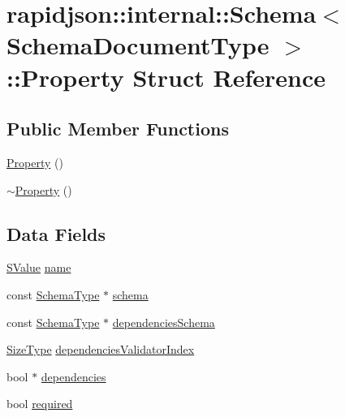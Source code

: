 \hypertarget{structrapidjson_1_1internal_1_1_schema_1_1_property}{}\section{rapidjson\+::internal\+::Schema$<$ Schema\+Document\+Type $>$\+::Property Struct Reference}
\label{structrapidjson_1_1internal_1_1_schema_1_1_property}
\subsection*{Public Member Functions}
\begin{DoxyCompactItemize}
\item 
\mbox{\hyperlink{structrapidjson_1_1internal_1_1_schema_1_1_property_ae57b1bcbf4c4762779462ff42ab47c27}{Property}} ()
\item 
\mbox{\hyperlink{structrapidjson_1_1internal_1_1_schema_1_1_property_a54b9c47ab0eae9b41b9807664f6ad2b3}{$\sim$\+Property}} ()
\end{DoxyCompactItemize}
\subsection*{Data Fields}
\begin{DoxyCompactItemize}
\item 
\mbox{\hyperlink{classrapidjson_1_1internal_1_1_schema_a9f716b06fc542c4cdb7d8d5cf463bf79}{S\+Value}} \mbox{\hyperlink{structrapidjson_1_1internal_1_1_schema_1_1_property_a3594b85ccedfaf6d8b52783146580abb}{name}}
\item 
const \mbox{\hyperlink{classrapidjson_1_1internal_1_1_schema_a62e03be17971648a9d614244ffcb0f10}{Schema\+Type}} $\ast$ \mbox{\hyperlink{structrapidjson_1_1internal_1_1_schema_1_1_property_a345dd1d9c4152bf936c4261627c04a44}{schema}}
\item 
const \mbox{\hyperlink{classrapidjson_1_1internal_1_1_schema_a62e03be17971648a9d614244ffcb0f10}{Schema\+Type}} $\ast$ \mbox{\hyperlink{structrapidjson_1_1internal_1_1_schema_1_1_property_a6bc5031766ca587b47c7da011c9f050c}{dependencies\+Schema}}
\item 
\mbox{\hyperlink{namespacerapidjson_a44eb33eaa523e36d466b1ced64b85c84}{Size\+Type}} \mbox{\hyperlink{structrapidjson_1_1internal_1_1_schema_1_1_property_a8834f6c103c631048a03e47be78370fa}{dependencies\+Validator\+Index}}
\item 
bool $\ast$ \mbox{\hyperlink{structrapidjson_1_1internal_1_1_schema_1_1_property_a9bb33d0a321891d3473762824d80ae1a}{dependencies}}
\item 
bool \mbox{\hyperlink{structrapidjson_1_1internal_1_1_schema_1_1_property_a09be9f2fd97139da880c5b2773a3c3a0}{required}}
\end{DoxyCompactItemize}


